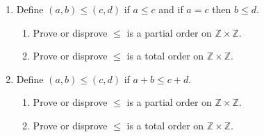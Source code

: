 \documentclass{article}
\begin{document}
\begin{enumerate}
\begin{enumerate}
\end{enumerate}

\item Define $(a, b)\leq (c, d)$ if $a\leq c$ and if $a=c$ then $b\leq d$.
\begin{enumerate}
\item Prove or disprove $\leq$ is a partial order on $\mathbb{Z}\times\mathbb{Z}$.
\item Prove or disprove $\leq$ is a total order on $\mathbb{Z}\times\mathbb{Z}$.

\end{enumerate}

\item Define $(a, b)\leq (c, d)$ if $a+b\leq c+d$.
\begin{enumerate}
\item Prove or disprove $\leq$ is a partial order on $\mathbb{Z}\times\mathbb{Z}$.
\item Prove or disprove $\leq$ is a total order on $\mathbb{Z}\times\mathbb{Z}$.

\end{enumerate}


\end{enumerate}
\end{document}
